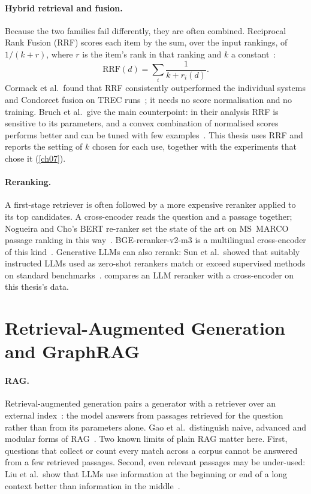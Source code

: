 \paragraph{Hybrid retrieval and fusion.} Because the two families fail differently, they are often combined.
Reciprocal Rank Fusion (RRF) scores each item by the sum, over the input rankings, of $1/(k + r)$, where $r$ is
the item's rank in that ranking and $k$ a constant~\cite{cormack2009reciprocal}:
\[
\mathrm{RRF}(d) = \sum_{i} \frac{1}{k + r_i(d)}.
\]
Cormack et al.\ found that RRF consistently outperformed the individual systems and Condorcet fusion on TREC
runs~\cite{cormack2009reciprocal}; it needs no score normalisation and no training. Bruch et al.\ give the main
counterpoint: in their analysis RRF is sensitive to its parameters, and a convex combination of normalised
scores performs better and can be tuned with few examples~\cite{bruch2023analysis}. This thesis uses RRF and
reports the setting of $k$ chosen for each use, together with the experiments that chose it (\cref{ch07}).

\paragraph{Reranking.} A first-stage retriever is often followed by a more expensive reranker applied to its
top candidates. A cross-encoder reads the question and a passage together; Nogueira and Cho's BERT re-ranker
set the state of the art on MS~MARCO passage ranking in this way~\cite{nogueira2019passage}. BGE-reranker-v2-m3
is a multilingual cross-encoder of this kind~\cite{baai2024bgererankerv2m3}. Generative LLMs can also rerank:
Sun et al.\ showed that suitably instructed LLMs used as zero-shot rerankers match or exceed supervised methods
on standard benchmarks~\cite{sun2023chatgpt}.  compares an LLM reranker with a cross-encoder on this
thesis's data.

\section{Retrieval-Augmented Generation and GraphRAG}\label{sec:ch02-retrieval-augmented-generation-and}

\paragraph{RAG.} Retrieval-augmented generation pairs a generator with a retriever over an external
index~\cite{lewis2020retrieval}: the model answers from passages retrieved for the question rather than from its
parameters alone. Gao et al.\ distinguish naive, advanced and modular forms of RAG~\cite{gao2023retrieval}.
Two known limits of plain RAG matter here. First, questions that collect or count every match across a corpus
cannot be answered from a few retrieved passages. Second, even relevant passages may be under-used: Liu et al.\
show that LLMs use information at the beginning or end of a long context better than information in the
middle~\cite{liu2024lost}.

